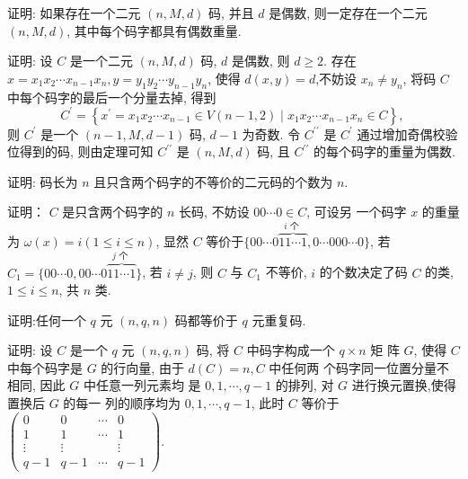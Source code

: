 \begin{exercise}
 证明: 如果存在一个二元 $ (n, M, d) $ 码, 并且 $ d $ 是偶数, 则一定存在一个二元 $ (n, M, d) $, 其中每个码字都具有偶数重量.
\end{exercise}
\begin{solution}
    证明: 设 $ C $ 是一个二元 $ (n, M, d) $ 码, $ d $ 是偶数, 则 $ d \geq 2 $.
存在 $ x=x_{1} x_{2} \cdots x_{n-1} x_{n}, y=y_{1} y_{2} \cdots y_{n-1} y_{n} $, 使得 $ d(x, y)=d $,不妨设 $ x_{n} \neq y_{n} $, 将码 $ C $ 中每个码字的最后一个分量去掉, 得到
$$
C^{\prime}=\left\{x^{\prime}=x_{1} x_{2} \cdots x_{n-1} \in V(n-1,2) \mid x_{1} x_{2} \cdots x_{n-1} x_{n} \in C\right\} \text {, }
$$
则 $ C^{\prime} $ 是一个 $ (n-1, M, d-1) $ 码, $ d-1 $ 为奇数.
令 $ C^{\prime \prime} $ 是 $ C^{\prime} $ 通过增加奇偶校验位得到的码, 则由定理可知 $ C^{\prime \prime} $ 是 $ (n, M, d) $ 码, 且 $ C^{\prime \prime} $ 的每个码字的重量为偶数.
\end{solution}


\begin{exercise}
证明: 码长为 $ n $ 且只含两个码字的不等价的二元码的个数为 $ n $.
\end{exercise}
\begin{solution}
    证明： $ C $ 是只含两个码字的 $ n $ 长码, 不妨设 $ 00 \cdots 0 \in C $, 可设另
一个码字 $ x $ 的重量为 $ \omega(x)=i(1 \leq i \leq n) $, 显然 $ C $ 等价于$
\{00 \cdots 0 \overbrace{11 \cdots 1}^{i \text { 个 }}, 0 \cdots 000 \cdots 0\}$, 
若 $ C_{1}=\{00 \cdots 0,00 \cdots 0 \overbrace{11 \cdots 1}^{j \text { 个 }}\} $, 若 $ i \neq j $, 则 $ C $ 与 $ C_{1} $ 不等价, $ i $ 的个数决定了码 $ C $ 的类, $ 1 \leq i \leq n $, 共 $ n $ 类.
\end{solution}


\begin{exercise}
证明:任何一个 $ q $ 元 $ (n, q, n) $ 码都等价于 $ q $ 元重复码.
\end{exercise}
\begin{solution}
    证明: 设 $ C $ 是一个 $ q $ 元 $ (n, q, n) $ 码, 将 $ C $ 中码字构成一个 $ q \times n $ 矩
阵 $ G $, 使得 $ C $ 中每个码字是 $ G $ 的行向量, 由于 $ d(C)=n, C $ 中任何两
个码字同一位置分量不相同, 因此 $ G $ 中任意一列元素均
是 $ 0,1, \cdots, q-1 $ 的排列, 对 $ G $ 进行换元置换,使得置换后 $ G $ 的每一
列的顺序均为 $ 0,1, \cdots, q-1 $,
此时 $ C $ 等价于 $ \left(\begin{array}{cccc}0 & 0 & \cdots & 0 \\ 1 & 1 & \cdots & 1 \\ \vdots & \vdots & & \vdots \\ q-1 & q-1 & \cdots & q-1\end{array}\right) $.
\end{solution}
